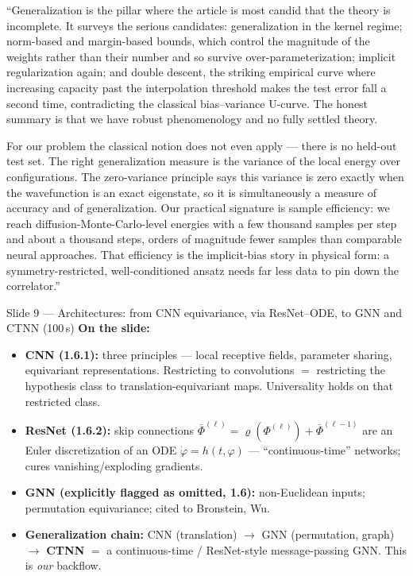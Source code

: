 \documentclass[11pt]{article}
\begin{document}
\begin{say}
``Generalization is the pillar where the article is most candid that the theory is incomplete. It
surveys the serious candidates: generalization in the kernel regime; norm-based and margin-based
bounds, which control the magnitude of the weights rather than their number and so survive
over-parameterization; implicit regularization again; and double descent, the striking empirical
curve where increasing capacity past the interpolation threshold makes the test error fall a second
time, contradicting the classical bias--variance U-curve. The honest summary is that we have robust
phenomenology and no fully settled theory.

For our problem the classical notion does not even apply --- there is no held-out test set. The right
generalization measure is the variance of the local energy over configurations. The zero-variance
principle says this variance is zero exactly when the wavefunction is an exact eigenstate, so it is
simultaneously a measure of accuracy and of generalization. Our practical signature is sample
efficiency: we reach diffusion-Monte-Carlo-level energies with a few thousand samples per step and
about a thousand steps, orders of magnitude fewer samples than comparable neural approaches. That
efficiency is the implicit-bias story in physical form: a symmetry-restricted, well-conditioned
ansatz needs far less data to pin down the correlator.''
\end{say}

\begin{slide}{Slide 9 --- Architectures: from CNN equivariance, via ResNet--ODE, to GNN and CTNN (100\,s)}
\textbf{On the slide:}
\begin{itemize}[leftmargin=*]
\item \textbf{CNN (1.6.1):} three principles --- local receptive fields, parameter sharing,
equivariant representations. Restricting to convolutions $=$ restricting the hypothesis class to
translation-equivariant maps. Universality holds on that restricted class.
\item \textbf{ResNet (1.6.2):} skip connections $\bar\Phi^{(\ell)}=\varrho(\Phi^{(\ell)})+
\bar\Phi^{(\ell-1)}$ are an Euler discretization of an ODE $\dot\varphi=h(t,\varphi)$ ---
``continuous-time'' networks; cures vanishing/exploding gradients.
\item \textbf{GNN (explicitly flagged as omitted, 1.6):} non-Euclidean inputs; permutation
equivariance; cited to Bronstein, Wu.
\item \textbf{Generalization chain:} CNN (translation) $\to$ GNN (permutation, graph) $\to$
\textbf{CTNN} $=$ a continuous-time / ResNet-style message-passing GNN. This is \emph{our} backflow.
\end{itemize}
\end{slide}
\end{document}
